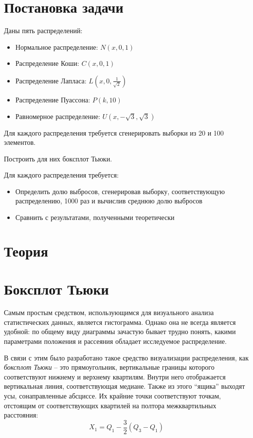 \section{Постановка задачи}
Даны пять распределений:
\begin{itemize}
\item Нормальное распределение: $N(x, 0, 1)$
\item Распределение Коши: $C(x, 0, 1)$
\item Распределение Лапласа: $L(x, 0, \frac{1}{\sqrt{2}})$
\item Распределение Пуассона: $P(k, 10)$
\item Равномерное распределение: $U(x, -\sqrt{3}, \sqrt{3})$
\end{itemize}

Для каждого распределения требуется сгенерировать выборки из 20 и 100 элементов.

Построить для них боксплот Тьюки.

Для каждого распределения требуется:
\begin{itemize}
	\item Определить долю выбросов, сгенерировав выборку, соответствующую распределению, 1000 раз и вычислив среднюю долю выбросов
	\item Сравнить с результатами, полученными теоретически
\end{itemize}

\section{Теория}

\section{Боксплот Тьюки}
Самым простым средством, использующимся для визуального анализа статистических данных, является гистограмма. Однако она не всегда является удобной: по общему виду диаграммы зачастую бывает трудно понять, какими параметрами положения и рассеяния обладает исследуемое распределение.

В связи с этим было разработано такое средство визуализации распределения, как \textit{боксплот Тьюки} -- это прямоугольник, вертикальные границы которого соответствуют нижнему и верхнему квартилям. Внутри него отображается вертикальная линия, соответствующая медиане. Также из этого ``ящика'' выходят усы, сонаправленные абсциссе. Их крайние точки соответствуют точкам, отстоящим от соответствующих квартилей на полтора межквартильных расстояния:
\begin{equation}
	X_1 = Q_1 - \frac{3}{2}(Q_3-Q_1)
\end{equation}

